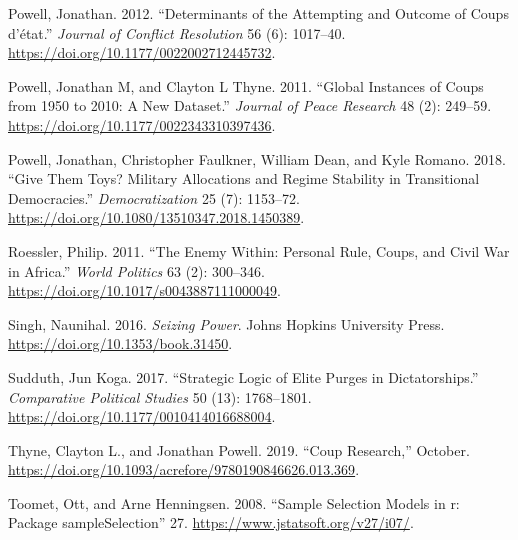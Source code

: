 \documentclass[
  12pt,
]{report}
\newlength{\cslhangindent}
\newenvironment{CSLReferences}[2] %
 {\begin{list}{}{%
  \setlength{\itemindent}{0pt}
  \setlength{\leftmargin}{0pt}
  \setlength{\parsep}{0pt}
  \ifodd #1
   \setlength{\leftmargin}{\cslhangindent}
   \setlength{\itemindent}{-1\cslhangindent}
  \fi
  \setlength{\itemsep}{#2\baselineskip}}}
 {\end{list}}
\begin{document}
\begin{CSLReferences}{1}{0}
Powell, Jonathan. 2012. {``Determinants of the Attempting and Outcome of
Coups d{'}état.''} \emph{Journal of Conflict Resolution} 56 (6):
1017--40. \url{https://doi.org/10.1177/0022002712445732}.

Powell, Jonathan M, and Clayton L Thyne. 2011. {``Global Instances of
Coups from 1950 to 2010: A New Dataset.''} \emph{Journal of Peace
Research} 48 (2): 249--59.
\url{https://doi.org/10.1177/0022343310397436}.

Powell, Jonathan, Christopher Faulkner, William Dean, and Kyle Romano.
2018. {``Give Them Toys? Military Allocations and Regime Stability in
Transitional Democracies.''} \emph{Democratization} 25 (7): 1153--72.
\url{https://doi.org/10.1080/13510347.2018.1450389}.

Roessler, Philip. 2011. {``The Enemy Within: Personal Rule, Coups, and
Civil War in Africa.''} \emph{World Politics} 63 (2): 300--346.
\url{https://doi.org/10.1017/s0043887111000049}.

Singh, Naunihal. 2016. \emph{Seizing Power}. Johns Hopkins University
Press. \url{https://doi.org/10.1353/book.31450}.

Sudduth, Jun Koga. 2017. {``Strategic Logic of Elite Purges in
Dictatorships.''} \emph{Comparative Political Studies} 50 (13):
1768--1801. \url{https://doi.org/10.1177/0010414016688004}.

Thyne, Clayton L., and Jonathan Powell. 2019. {``Coup Research,''}
October. \url{https://doi.org/10.1093/acrefore/9780190846626.013.369}.

Toomet, Ott, and Arne Henningsen. 2008. {``Sample Selection Models in
{\textbraceleft}r{\textbraceright}: Package
{\textbraceleft}sampleSelection{\textbraceright}''} 27.
\url{https://www.jstatsoft.org/v27/i07/}.

\end{CSLReferences}
\end{document}
